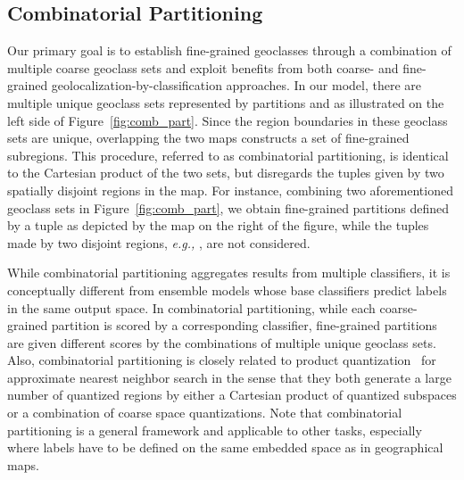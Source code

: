 \documentclass[runningheads]{llncs}
\begin{document}
\subsection{Combinatorial Partitioning}
\label{sec:sub:part}
\iffalse
We propose a novel classification-based geolocalization model using a combination of multiple geoclass sets.
Unfortunately, there is no standard method to define geoclasses for image geolocalization and an arbitrary choice may incur undesirable artifacts.
We alleviate this limitation by diversifying geoclass sets; we construct multiple distinct geoclass sets by applying different partitioning criteria.
\fi
Our primary goal is to establish fine-grained geoclasses through a combination of multiple coarse geoclass sets and exploit benefits from both coarse- and fine-grained geolocalization-by-classification approaches.
In our model, there are multiple unique geoclass sets represented by partitions  and  as illustrated on the left side of Figure~\ref{fig:comb_part}.
Since the region boundaries in these geoclass sets are unique, overlapping the two maps constructs a set of fine-grained subregions.
This procedure, referred to as combinatorial partitioning, is identical to the Cartesian product of the two sets, but disregards the tuples given by two spatially disjoint regions in the map.
For instance, combining two aforementioned geoclass sets in Figure~\ref{fig:comb_part}, we obtain fine-grained partitions defined by a tuple  as depicted by the map on the right of the figure, while the tuples made by two disjoint regions, {\it e.g.,} , are not considered.


While combinatorial partitioning aggregates results from multiple classifiers, it is conceptually different from ensemble models whose base classifiers predict labels in the same output space.
In combinatorial partitioning, while each coarse-grained partition is scored by a corresponding classifier, fine-grained partitions are given different scores by the combinations of multiple unique geoclass sets.
Also, combinatorial partitioning is closely related to product quantization~\cite{jegou11product} for approximate nearest neighbor search in the sense that they both generate a large number of quantized regions by either a Cartesian product of quantized subspaces or a combination of coarse space quantizations. 
Note that combinatorial partitioning is a general framework and applicable to other tasks, especially where labels have to be defined on the same embedded space as in geographical maps.
\end{document}
